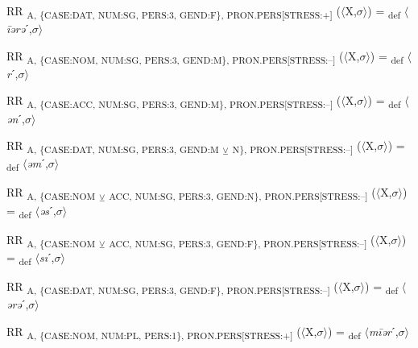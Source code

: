 {\begin{exe}
 RR \textsubscript{A, \{CASE:DAT, NUM:SG, PERS:3, GEND:F\}, PRON.PERS[STRESS:+]} ($\langle$X,$\sigma $$\rangle$) = \textsubscript{def} $\langle$\textit{\=iərə}ˊ,$\sigma $$\rangle$
\end{exe}

\begin{exe}
 RR \textsubscript{A, \{CASE:NOM, NUM:SG, PERS:3, GEND:M\}, PRON.PERS[STRESS:–]} ($\langle$X,$\sigma $$\rangle$) = \textsubscript{def} $\langle$\textit{r}ˊ,$\sigma $$\rangle$
\end{exe}

\begin{exe}
 RR \textsubscript{A, \{CASE:ACC, NUM:SG, PERS:3, GEND:M\}, PRON.PERS[STRESS:–]} ($\langle$X,$\sigma $$\rangle$) = \textsubscript{def} $\langle$\textit{ən}ˊ,$\sigma $$\rangle$
\end{exe}

\begin{exe}
 RR \textsubscript{A, \{CASE:DAT, NUM:SG, PERS:3, GEND:M} \textsubscript{${\veebar}$}\textsubscript{ N\}, PRON.PERS[STRESS:–]} ($\langle$X,$\sigma $$\rangle$) = \textsubscript{def} $\langle$\textit{əm}ˊ,$\sigma $$\rangle$
\end{exe}

\begin{exe}
 RR \textsubscript{A, \{CASE:NOM} \textsubscript{${\veebar}$}\textsubscript{ ACC, NUM:SG, PERS:3, GEND:N\}, PRON.PERS[STRESS:–]} ($\langle$X,$\sigma $$\rangle$) = \textsubscript{def} $\langle$\textit{əs}ˊ,$\sigma $$\rangle$
\end{exe}

\begin{exe}
 RR \textsubscript{A, \{CASE:NOM} \textsubscript{${\veebar}$}\textsubscript{ ACC, NUM:SG, PERS:3, GEND:F\}, PRON.PERS[STRESS:–]} ($\langle$X,$\sigma $$\rangle$) = \textsubscript{def} $\langle$\textit{sı}ˊ,$\sigma $$\rangle$
\end{exe}

\begin{exe}
 RR \textsubscript{A, \{CASE:DAT, NUM:SG, PERS:3, GEND:F\}, PRON.PERS[STRESS:–]} ($\langle$X,$\sigma $$\rangle$) = \textsubscript{def} $\langle$\textit{ərə}ˊ,$\sigma $$\rangle$
\end{exe}

\begin{exe}
 RR \textsubscript{A, \{CASE:NOM, NUM:PL, PERS:1\}, PRON.PERS[STRESS:+]} ($\langle$X,$\sigma $$\rangle$) = \textsubscript{def} $\langle$\textit{m\=iər}ˊ,$\sigma $$\rangle$
\end{exe}

}
